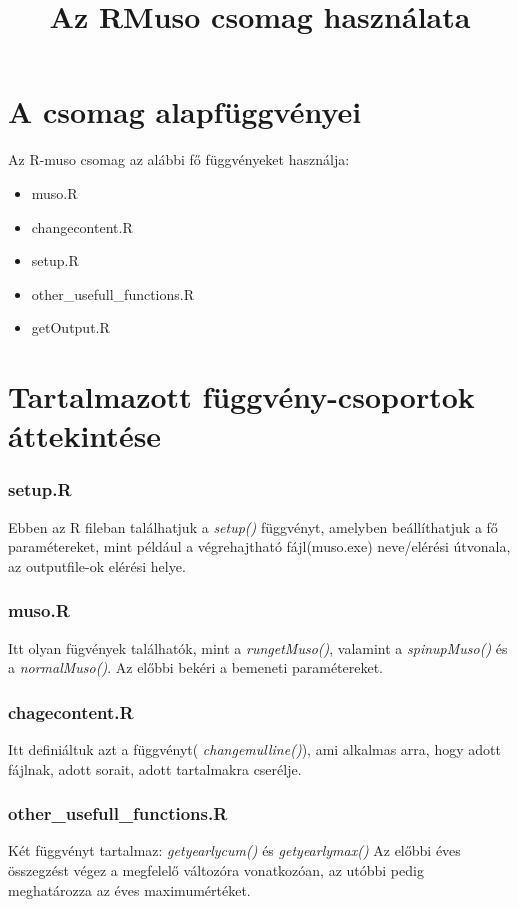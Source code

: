 \documentclass[12pt,a4paper]{article}
\title{Az RMuso csomag használata}
\begin{document}
\maketitle
\section{A csomag alapfüggvényei}

Az R-muso csomag az alábbi fő függvényeket használja:

\begin{itemize}
\item muso.R
\item changecontent.R
\item setup.R
\item other\_usefull\_functions.R
\item getOutput.R
\end{itemize}
\section{Tartalmazott függvény-csoportok áttekintése}
\subsubsection*{setup.R}
Ebben az R fileban találhatjuk a \textit{setup()} függvényt, amelyben beállíthatjuk a fő paramétereket, mint például a végrehajtható fájl(muso.exe) neve/elérési útvonala, az outputfile-ok elérési helye.
\subsubsection*{muso.R}
Itt olyan fügvények találhatók, mint a \textit{rungetMuso()}, valamint a \textit{spinupMuso()} és a \textit{normalMuso()}. Az előbbi bekéri a bemeneti paramétereket.  
\subsubsection*{chagecontent.R}
Itt definiáltuk azt a függvényt( \textit{changemulline()}), ami alkalmas arra, hogy adott fájlnak, adott sorait, adott tartalmakra cserélje.
\subsubsection*{other\_usefull\_functions.R}
Két függvényt tartalmaz: \textit{getyearlycum()} és \textit{getyearlymax()} Az előbbi éves összegzést végez a megfelelő változóra vonatkozóan, az utóbbi pedig meghatározza az éves maximumértéket.
\end{document}
